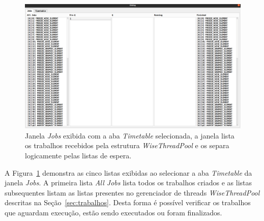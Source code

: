 \begin{figure}[!htbp]
	\centering
	\includegraphics[width=\linewidth]{Figures/IGU_022.png}
	\caption{Janela \textit{Jobs} exibida com a aba \textit{Timetable} selecionada, a janela lista os trabalhos recebidos pela estrutura \textit{WiseThreadPool} e os separa logicamente pelas listas de espera.}
	\label{fig:jobs2}
\end{figure}

A Figura~\ref{fig:jobs2} demonstra as cinco listas exibidas ao selecionar a aba \textit{Timetable} da janela \textit{Jobs}. A primeira lista \textit{All Jobs} lista todos os trabalhos criados e as listas subsequentes listam as listas presentes no gerenciador de threads \textit{WiseThreadPool} descritas na Seção~\ref{sec:trabalhos}. Desta forma é possível verificar os trabalhos que aguardam execução, estão sendo executados ou foram finalizados.